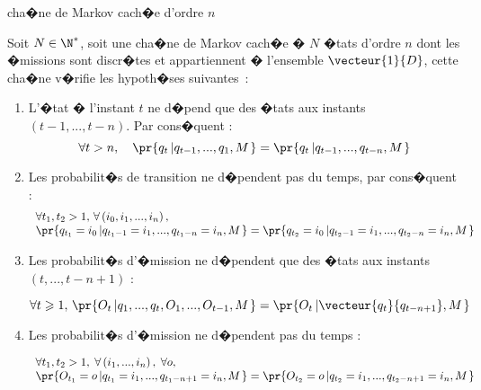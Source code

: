         \begin{xdefinition}{cha�ne de Markov cach�e d'ordre $n$}
        \label{hmm_markov_ordre_n_def}%
        
        Soit $N\in\N^{\ast}$, soit une cha�ne de Markov cach�e � $N$ �tats d'ordre $n$ dont les �missions sont discr�tes 
        et appartiennent � l'ensemble $\vecteur{1}{D}$, cette cha�ne v�rifie les hypoth�ses suivantes~:
        
        \begin{enumerate}
        \item L'�tat � l'instant $t$ ne d�pend que des �tats aux instants $\left(  t-1,...,t-n\right)$. Par cons�quent :
                $$
                \forall t>n,\quad \pr{q_{t}\left|  q_{t-1},...,q_{1},M\right. }  = \pr{  q_{t}\left| 
                 q_{t-1},...,q_{t-n},M\right. }
                $$
        
        \item Les probabilit�s de transition ne d�pendent pas du temps, par cons�quent :
                $$
                \begin{array}{l}
                \forall t_{1},t_{2}>1,\,\forall\left(i_{0},i_{1},...,i_{n}\right)  ,\\
                \pr{  q_{t_{1}}=i_{0}\left|q_{t_{1}-1}=i_{1},...,q_{t_{1}-n}=i_{n},M\right.  }  
                = \pr{  q_{t_{2}}=i_{0}\left|  q_{t_{2}-1}=i_{1},
                ...,q_{t_{2}-n}=i_{n},M\right. }
                \end{array}
                $$
        
        \item Les probabilit�s d'�mission ne d�pendent que des �tats aux instants $\left(  t,...,t-n+1\right)$ :
        
                $$
                \forall t\geqslant 1,\, \pr{ O_{t}\left|q_{1},...,q_{t},O_{1},...,O_{t-1},M\right.  } =
                    \pr{  O_{t}\left| 
                 \vecteur{q_{t}}{q_{t-n+1}},M\right.}
                $$
        
        \item Les probabilit�s d'�mission ne d�pendent pas du temps :
        
                $$
                \begin{array}{l}
                \forall t_{1},t_{2}>1,\;\forall\left(i_{1},...,i_{n}\right), \; \forall o, \\
                \pr{  O_{t_{1}}=o\left|q_{t_{1}}=i_{1},...,q_{t_{1}-n+1}=i_{n},M\right.  }  =
                \pr{ O_{t_{2}}=o\left| 
                 q_{t_{2}}=i_{1},
                ...,q_{t_{2}-n+1}=i_{n},M\right.  }
                \end{array}
                $$
        
        \end{enumerate}
        
        \end{xdefinition}
        
